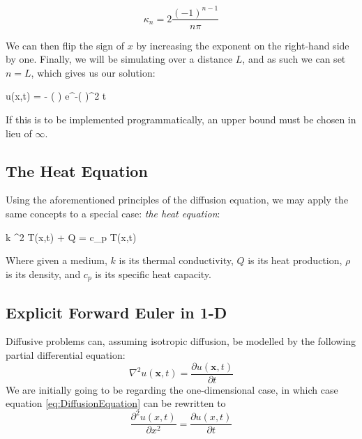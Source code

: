 \documentclass[a4paper,10pt,english]{article}
\newenvironment{boxequation}{
\begin{tcolorbox}[ams equation, enhanced, colback=black!50!green!10!white, colframe=black, fuzzy shadow={0mm}{-4pt}{-0.5pt}{0.4mm}{black!60!white}]}
{\end{tcolorbox}}
\renewcommand{\vec}[1]{\mathbf{#1}}
\begin{document}
\begin{equation*}
\kappa_n = 2\frac{(-1)^{n-1}}{n \pi}
\end{equation*}

We can then flip the sign of $x$ by increasing the exponent on the right-hand side by one.  Finally, we will be simulating over a distance $L$, and as such we can set $n = L$, which gives us our solution:

\begin{boxequation}
\label{eq_analytical}
u(x,t) = - \sin \left(  \right) e^{-\left(  \right)^2 t}
\end{boxequation}

If this is to be implemented programmatically, an upper bound must be chosen in lieu of $\infty$.

\subsection*{The Heat Equation}

Using the aforementioned principles of the diffusion equation, we may apply the same concepts to a special case: \textit{the heat equation}:

\begin{boxequation}
\label{eq_heat}
k \nabla^2 T(x,t) + Q = \rho c_p  T(x,t)
\end{boxequation}

Where given a medium, $k$ is its thermal conductivity, $Q$ is its heat production, $\rho$ is its density, and $c_p$ is its specific heat capacity. 

\subsection*{Explicit Forward Euler in 1-D}


Diffusive problems can, assuming isotropic diffusion, be modelled by the following partial differential equation:
\begin{equation}
\nabla^{2} u(\vec{x}, t) = \dfrac{\partial u(\vec{x}, t)}{\partial t}
\label{eq:DiffusionEquation}
\end{equation}
We are initially going to be regarding the one-dimensional case, in which case equation \ref{eq:DiffusionEquation} can be rewritten to 
\begin{equation}
\dfrac{\partial^2 u(x,t)}{\partial x^2} = \dfrac{\partial u(x,t)}{\partial t}
\label{eq:Diffusive1D}
\end{equation}
\end{document}
